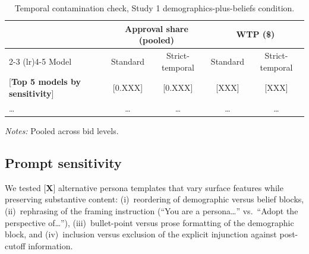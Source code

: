 \documentclass[12pt]{article}
\begin{document}
\begin{table}[h]
    \centering
    \caption{Temporal contamination check, Study 1 demographics-plus-beliefs condition.}
    \label{tab:temporal}
    \begin{threeparttable}
    \begin{tabular}{lcccc}
        \toprule
         & \multicolumn{2}{c}{Approval share (pooled)} & \multicolumn{2}{c}{WTP (\$)} \\
        \cmidrule(lr){2-3} \cmidrule(lr){4-5}
        Model & Standard & Strict-temporal & Standard & Strict-temporal \\
        \midrule
        {[}\textbf{Top 5 models by sensitivity}{]} & [0.XXX] & [0.XXX] & [XXX] & [XXX] \\
        \dots & \dots & \dots & \dots & \dots \\
        \bottomrule
    \end{tabular}
    \begin{tablenotes}\footnotesize
        \item \textit{Notes:} Pooled across bid levels.
    \end{tablenotes}
    \end{threeparttable}
\end{table}

\subsection{Prompt sensitivity}

We tested [\textbf{X}] alternative persona templates that vary surface features while preserving substantive content: (i)~reordering of demographic versus belief blocks, (ii)~rephrasing of the framing instruction (``You are a persona\dots'' vs.\ ``Adopt the perspective of\dots''), (iii)~bullet-point versus prose formatting of the demographic block, and (iv)~inclusion versus exclusion of the explicit injunction against post-cutoff information.
\end{document}

